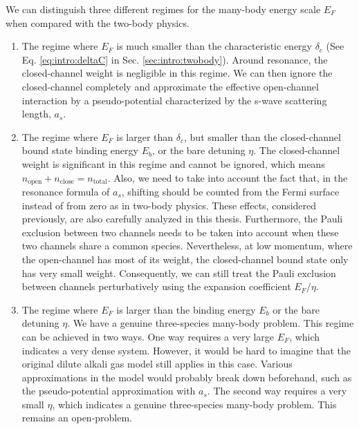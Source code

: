 We can distinguish three different regimes for the many-body energy scale $E_F$ when compared with the two-body physics.  
\begin{enumerate}
\item The regime where $E_F$ is much smaller than the characteristic energy $\delta_c$ (See Eq. \ref{eq:intro:deltaC} in Sec. \ref{sec:intro:twobody}). Around resonance, the closed-channel weight is negligible in this regime. We can then ignore the closed-channel completely and approximate the effective open-channel interaction by a  pseudo-potential characterized by the s-wave scattering length, $a_s$. 
\item The regime where  $E_F$ is larger than $\delta_c$, but smaller than the closed-channel bound state binding energy $E_b$, or the bare detuning $\eta$.  The closed-channel weight is significant in this regime and cannot be ignored, which means $n_{\text{open}}+n_{\text{close}}=n_{\text{total}}$. Also, we need to take into account the fact that, in the resonance formula of $a_s$, shifting should be counted from the Fermi surface instead of from zero as in two-body physics.    These effects, considered previously\cite{GurarieNarrow}, are  also carefully analyzed in this thesis.  Furthermore, the Pauli exclusion between two channels needs to be taken into account when these two channels share a common species.  Nevertheless, at  low momentum, where the open-channel has most of its weight, the closed-channel bound state only has very small weight.  Consequently, we can still treat the Pauli exclusion between channels perturbatively using the expansion coefficient  $E_F/\eta$. 
\item The regime where  $E_F$ is larger than the binding energy $E_b$ or the bare detuning $\eta$. We have a genuine three-species many-body problem. This regime can be achieved in two ways.  One way requires a very large $E_F$, which indicates a very dense system.  However, it would be hard to imagine that  the original dilute alkali gas model still applies in this case. Various approximations in the model would probably break down beforehand, such as the pseudo-potential approximation with $a_s$. The second way requires a very small $\eta$, which indicates a genuine three-species many-body problem.  This remains an open-problem.   
\end{enumerate}
 

 



